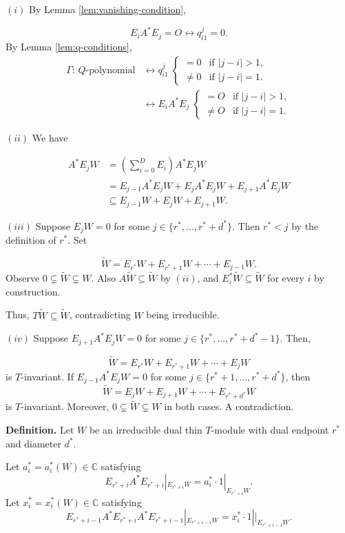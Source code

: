 \documentclass[
]{book}
\theoremstyle{definition}
\theoremstyle{definition}
\theoremstyle{definition}
\theoremstyle{definition}
\theoremstyle{remark}
\begin{document}
\((i)\) By Lemma \ref{lem:vanishing-condition},

\[E_iA^*E_j = O \leftrightarrow q^j_{i1} = 0.\]
By Lemma \ref{lem:q-conditions},
\begin{align}
\Gamma\text{: $Q$-polynomial} &\leftrightarrow q^j_{i1} \;\begin{cases} = 0 & \text{if }|j-i|>1,\\
\neq 0 & \text{if }|j-i|=1.\end{cases}\\
& \leftrightarrow E_iA^*E_j \;\begin{cases} = O & \text{if }|j-i|>1,\\
\neq O & \text{if }|j-i|=1.\end{cases}
\end{align}

\((ii)\) We have

\begin{align}
A^*E_jW & = \left(\sum_{i=0}^{D}E_i\right)A^*E_jW\\
& = E_{j-1}A^*E_jW + E_jA^*E_jW + E_{j+1}A^*E_jW\\
& \subseteq E_{j-1}W + E_jW + E_{j+1}W.
\end{align}

\((iii)\) Suppose \(E_jW = 0\) for some \(j\in \{r^*, \ldots, r^*+d^*\}\). Then \(r^* < j\) by the definition of \(r^*\). Set

\[\widetilde{W} = E_{r^*}W + E_{r^*+1}W + \cdots + E_{j-1}W.\]
Observe \(0\subsetneq \widetilde{W} \subsetneq W\).
Also \(A\widetilde{W} \subseteq \widetilde{W}\) by \((ii)\), and \(E_i^*\widetilde{W} \subseteq \widetilde{W}\) for every \(i\) by construction.

Thus, \(T\widetilde{W} \subseteq \widetilde{W}\), contradicting \(W\) being irreducible.

\((iv)\) Suppose \(E_{j+1}A^*E_jW = 0\) for some \(j\in \{r^*, \ldots, r^*+d^*-1\}\). Then,

\[\widetilde{W} = E_{r^*}W + E_{r^*+1}W + \cdots + E_{j}W\]
is \(T\)-invariant. If \(E_{j-1}A^*E_jW = 0\) for some \(j\in \{r^*+1, \ldots, r^*+d^*\}\), then
\[\widetilde{W} = E_{j}W + E_{j+1}W + \cdots + E_{r^*+d^*}W\]
is \(T\)-invariant. Moreover, \(0 \subsetneq \widetilde{W} \subsetneq W\) in both cases. A contradiction.

\hfill\break

\textbf{Definition.} Let \(W\) be an irreducible dual thin \(T\)-module with dual endpoint \(r^*\) and diameter \(d^*\).

Let \(a^*_i = a^*_i(W)\in\mathbb{C}\) satisfying
\[E_{r^*+i}A^*E_{r^*+i}|_{E_{r^*+i}W} = a^*_i\cdot 1|_{E_{r^*+i}W}.\]
Let \(x^*_i = x^*_i(W)\in \mathbb{C}\) satisfying
\[E_{r^*+i-1}A^*E_{r^*+i}A^*E_{r^*+i-1}|_{E_{r^*+i-1}W} = x^*_i\cdot 1||_{E_{r^*+i-1}W}.\]
\end{document}
